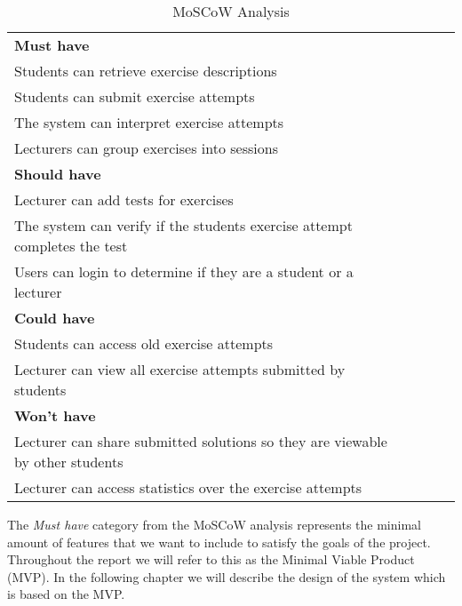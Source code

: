 \begin{table}[H]
    \begin{tabular}{|l|llll}
    \cline{1-1}
    \cellcolor[HTML]{C0C0C0}\textbf{Must have}                                    &  &  &  &  \\ \cline{1-1}
    Students can retrieve exercise descriptions                                   &  &  &  &  \\ \cline{1-1}
    Students can submit exercise attempts                                         &  &  &  &  \\ \cline{1-1}
    The system can interpret exercise attempts                                    &  &  &  &  \\ \cline{1-1}
    Lecturers can group exercises into sessions                                   &  &  &  &  \\ \cline{1-1}
    \cellcolor[HTML]{C0C0C0}\textbf{Should have}                                  &  &  &  &  \\ \cline{1-1}
    Lecturer can add tests for exercises                                          &  &  &  &  \\ \cline{1-1}
    The system can verify if the students exercise attempt completes the test     &  &  &  &  \\ \cline{1-1}
    Users can login to determine if they are a student or a lecturer              &  &  &  &  \\ \cline{1-1}
    \cellcolor[HTML]{C0C0C0}\textbf{Could have}                                   &  &  &  &  \\ \cline{1-1}
    Students can access old exercise attempts                                     &  &  &  &  \\ \cline{1-1}
    Lecturer can view all exercise attempts submitted by students                 &  &  &  &  \\ \cline{1-1}
    \cellcolor[HTML]{C0C0C0}\textbf{Won't have}                                    &  &  &  &  \\ \cline{1-1}
    Lecturer can share submitted solutions so they are viewable by other students &  &  &  &  \\ \cline{1-1}
    Lecturer can access statistics over the exercise attempts                     &  &  &  &  \\ \cline{1-1}
    \end{tabular}
    \caption{\label{tab:MoSCoW}MoSCoW Analysis}
\end{table}

The \textit{Must have} category from the MoSCoW analysis represents the minimal amount of features that we want to include to satisfy the goals of the project. Throughout the report we will refer to this as the Minimal Viable Product (MVP).
In the following chapter we will describe the design of the system which is based on the MVP.
